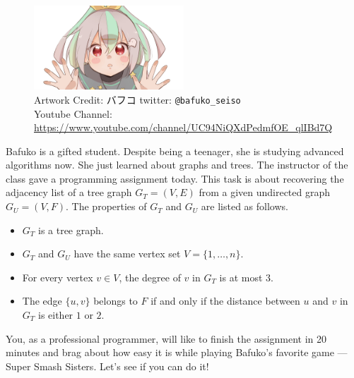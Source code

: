 \begin{figure}[h]
\center
\includegraphics[width=0.5\textwidth]{image/bafuko.jpg}\\
Artwork Credit: バフコ twitter: \verb+@bafuko_seiso+\\
Youtube Channel: \url{https://www.youtube.com/channel/UC94NiQXdPedmfOE_qlIBd7Q}
\end{figure}

Bafuko is a gifted student. Despite being a teenager, 
she is studying advanced algorithms now. 
She just learned about graphs and trees. 
The instructor of the class gave a programming assignment today. 
This task is about recovering the adjacency list of a tree graph $G_T=(V,E)$
from a given undirected graph $G_U=(V,F)$. The properties of $G_T$ and $G_U$ are
listed as follows.
\begin{itemize}
\item $G_T$ is a tree graph.
\item $G_T$ and $G_U$ have the same vertex set $V=\{1,\ldots,n\}$.
\item For every vertex $v\in V$, the degree of $v$ in $G_T$ is at most $3$.
\item The edge $\{u,v\}$ belongs to $F$ if and only if the distance between 
      $u$ and $v$ in $G_T$ is either $1$ or $2$.
\end{itemize}

You, as a professional programmer, will like to finish the assignment 
in 20 minutes and brag about how easy it is while 
playing Bafuko's favorite game --- Super Smash Sisters.
Let's see if you can do it!
